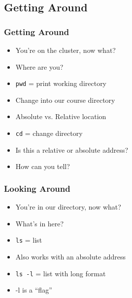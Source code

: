 \documentclass[14pt]{beamer}
\begin{document}
\subsection{Getting Around}

\begin{frame}
\frametitle{Getting Around}
\begin{itemize}
	\item You're on the cluster, now what?
	\item Where are you?
	\ttfamily
	\sffamily
	\item[] \texttt{pwd} = print working directory 
	\item Change into our course directory
	\item Absolute vs. Relative location
	\ttfamily
	\sffamily
	\normalsize
	\item[] \texttt{cd} = change directory
	\item Is this a relative or absolute address?
	\item How can you tell?
\end{itemize}
\end{frame}

\begin{frame}
\frametitle{Looking Around}
\begin{itemize}
	\item You're in our directory, now what?
	\item What's in here?
	\ttfamily
	\sffamily
	\item[] \texttt{ls} = list
	\item Also works with an absolute address
	\ttfamily
	\sffamily
	\normalsize
	\item[] \texttt{ls -l} = list with long format
	\item -l is a ``flag''
\end{itemize}
\end{frame}
\end{document}
